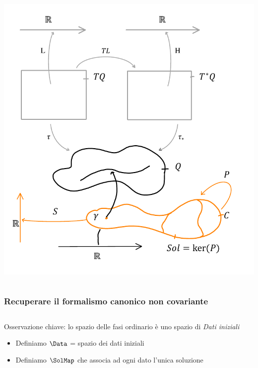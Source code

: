 \begin{frame}
\begin{columns}[T]
    		   	\begin{column}{.5\textwidth}
					\parbox[c][.7\textheight][c]{\columnwidth}{%
						\includegraphics [width=\textwidth]{Presentazione/GeoMecFrameB} 
					}
    			\end{column}
  			\end{columns}		
		\end{frame}


		\begin{frame} 	%
			\frametitle{Recuperare il formalismo canonico non covariante }		
  			\begin{columns}[T]
    			\begin{column}{.5\textwidth}
					Osservazione chiave: lo spazio delle fasi ordinario è uno spazio di \emph{Dati iniziali}
					\begin{itemize}
						\item<1-> Definiamo $\Data$ = spazio dei dati iniziali 
						\item<2-> Definiamo $\SolMap$ che associa ad ogni dato l'unica soluzione
					\end{itemize}
    			\end{column}
    		   	\begin{column}{.5\textwidth}
    			\end{column}
  			\end{columns}		

		\end{frame}

